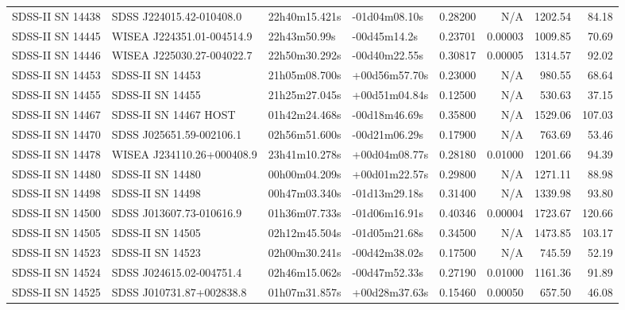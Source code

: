 \begin{longtable}{llllrrrr}
SDSS-II SN 14438 &        SDSS J224015.42-010408.0 &   22h40m15.421s &   -01d04m08.10s &  0.28200 &      N/A &  1202.54 &       84.18 \\
SDSS-II SN 14445 &       WISEA J224351.01-004514.9 &    22h43m50.99s &    -00d45m14.2s &  0.23701 &  0.00003 &  1009.85 &       70.69 \\
SDSS-II SN 14446 &       WISEA J225030.27-004022.7 &   22h50m30.292s &   -00d40m22.55s &  0.30817 &  0.00005 &  1314.57 &       92.02 \\
SDSS-II SN 14453 &                SDSS-II SN 14453 &   21h05m08.700s &   +00d56m57.70s &  0.23000 &      N/A &   980.55 &       68.64 \\
SDSS-II SN 14455 &                SDSS-II SN 14455 &   21h25m27.045s &   +00d51m04.84s &  0.12500 &      N/A &   530.63 &       37.15 \\
SDSS-II SN 14467 &           SDSS-II SN 14467 HOST &   01h42m24.468s &   -00d18m46.69s &  0.35800 &      N/A &  1529.06 &      107.03 \\
SDSS-II SN 14470 &        SDSS J025651.59-002106.1 &   02h56m51.600s &   -00d21m06.29s &  0.17900 &      N/A &   763.69 &       53.46 \\
SDSS-II SN 14478 &       WISEA J234110.26+000408.9 &   23h41m10.278s &   +00d04m08.77s &  0.28180 &  0.01000 &  1201.66 &       94.39 \\
SDSS-II SN 14480 &                SDSS-II SN 14480 &   00h00m04.209s &   +00d01m22.57s &  0.29800 &      N/A &  1271.11 &       88.98 \\
SDSS-II SN 14498 &                SDSS-II SN 14498 &   00h47m03.340s &   -01d13m29.18s &  0.31400 &      N/A &  1339.98 &       93.80 \\
SDSS-II SN 14500 &        SDSS J013607.73-010616.9 &   01h36m07.733s &   -01d06m16.91s &  0.40346 &  0.00004 &  1723.67 &      120.66 \\
SDSS-II SN 14505 &                SDSS-II SN 14505 &   02h12m45.504s &   -01d05m21.68s &  0.34500 &      N/A &  1473.85 &      103.17 \\
SDSS-II SN 14523 &                SDSS-II SN 14523 &   02h00m30.241s &   -00d42m38.02s &  0.17500 &      N/A &   745.59 &       52.19 \\
SDSS-II SN 14524 &        SDSS J024615.02-004751.4 &   02h46m15.062s &   -00d47m52.33s &  0.27190 &  0.01000 &  1161.36 &       91.89 \\
SDSS-II SN 14525 &        SDSS J010731.87+002838.8 &   01h07m31.857s &   +00d28m37.63s &  0.15460 &  0.00050 &   657.50 &       46.08 \\

\end{longtable}
